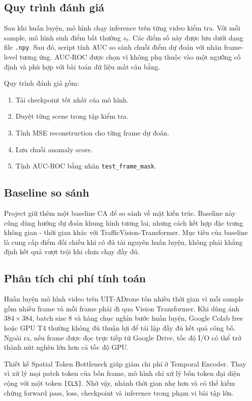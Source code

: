 \subsection{Quy trình đánh giá}

Sau khi huấn luyện, mô hình chạy inference trên từng video kiểm tra. Với mỗi sample, mô hình sinh điểm bất thường $s_t$. Các điểm số này được lưu dưới dạng file \texttt{.npy}. Sau đó, script tính AUC so sánh chuỗi điểm dự đoán với nhãn frame-level tương ứng. AUC-ROC được chọn vì không phụ thuộc vào một ngưỡng cố định và phù hợp với bài toán dữ liệu mất cân bằng.

Quy trình đánh giá gồm:
\begin{enumerate}
    \item Tải checkpoint tốt nhất của mô hình.
    \item Duyệt từng scene trong tập kiểm tra.
    \item Tính MSE reconstruction cho từng frame dự đoán.
    \item Lưu chuỗi anomaly score.
    \item Tính AUC-ROC bằng nhãn \texttt{test\_frame\_mask}.
\end{enumerate}

\subsection{Baseline so sánh}

Project giữ thêm một baseline CA để so sánh về mặt kiến trúc. Baseline này cũng dùng hướng dự đoán khung hình tương lai, nhưng cách kết hợp đặc trưng không gian - thời gian khác với TrafficVision-Transformer. Mục tiêu của baseline là cung cấp điểm đối chiếu khi có đủ tài nguyên huấn luyện, không phải khẳng định kết quả vượt trội khi chưa chạy đầy đủ.

\subsection{Phân tích chi phí tính toán}

Huấn luyện mô hình video trên UIT-ADrone tốn nhiều thời gian vì mỗi sample gồm nhiều frame và mỗi frame phải đi qua Vision Transformer. Khi dùng ảnh $384 \times 384$, batch size 8 và hàng chục nghìn bước huấn luyện, Google Colab free hoặc GPU T4 thường không đủ thuận lợi để tái lập đầy đủ kết quả công bố. Ngoài ra, nếu frame được đọc trực tiếp từ Google Drive, tốc độ I/O có thể trở thành nút nghẽn lớn hơn cả tốc độ GPU.

Thiết kế Spatial Token Bottleneck giúp giảm chi phí ở Temporal Encoder. Thay vì xử lý mọi patch token của bốn frame, mô hình chỉ xử lý bốn token đại diện cộng với một token \texttt{[CLS]}. Nhờ vậy, nhánh thời gian nhẹ hơn và có thể kiểm chứng forward pass, loss, checkpoint và inference trong phạm vi bài tập lớn.

